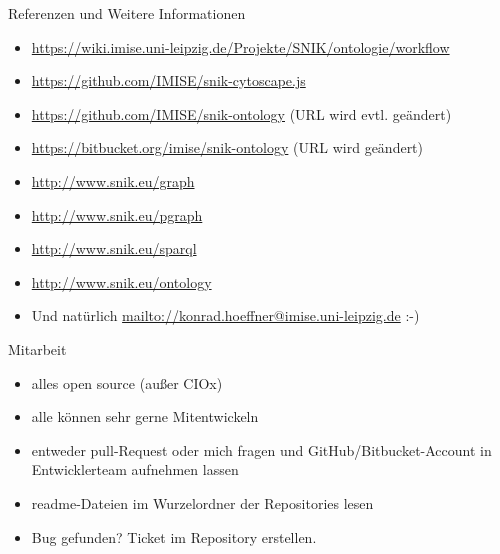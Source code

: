 \documentclass[14pt,aspectratio=1610]{beamer}
\begin{document}
\begin{frame}{Referenzen und Weitere Informationen}
\begin{itemize}
\item \url{https://wiki.imise.uni-leipzig.de/Projekte/SNIK/ontologie/workflow}
\item \url{https://github.com/IMISE/snik-cytoscape.js}
\item \url{https://github.com/IMISE/snik-ontology} (URL wird evtl. geändert)
\item \url{https://bitbucket.org/imise/snik-ontology} (URL wird geändert)
\item \url{http://www.snik.eu/graph}
\item \url{http://www.snik.eu/pgraph}
\item \url{http://www.snik.eu/sparql}
\item \url{http://www.snik.eu/ontology}
\item Und natürlich \href{mich fragen}{mailto://konrad.hoeffner@imise.uni-leipzig.de} :-)
\end{itemize}
\end{frame}

\begin{frame}{Mitarbeit}
\begin{itemize}
\item alles open source (außer CIOx)
\item alle können sehr gerne Mitentwickeln
\item entweder pull-Request oder mich fragen und GitHub/Bitbucket-Account in Entwicklerteam aufnehmen lassen
\item readme-Dateien im Wurzelordner der Repositories lesen
\item Bug gefunden? Ticket im Repository erstellen.
\end{itemize}
\end{frame}
\end{document}
